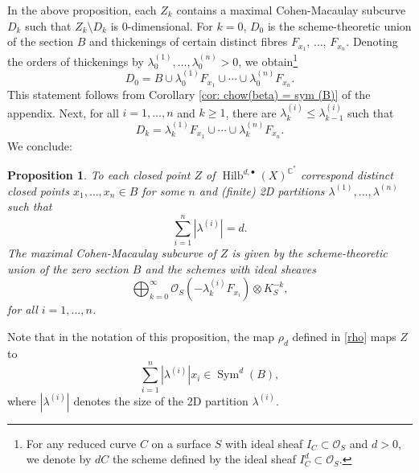 \documentclass{amsart}
\newtheorem{proposition}[theorem]{Proposition}
\theoremstyle{definition}
\newcommand{\CC} {\mathbb{C}}          %
\renewcommand{\O}{\mathcal{O}}
\newcommand{\Sym}{\operatorname{Sym}}
\newcommand{\Hilb}{\operatorname{Hilb}}
\begin{document}
In the above proposition, each $Z_k$ contains a maximal Cohen-Macaulay subcurve $D_k$ such that $Z_k \setminus D_k$ is 0-dimensional. For $k=0$, $D_0$ is the scheme-theoretic union of the section $B$ and thickenings of certain distinct fibres $F_{x_1}$, $\ldots$, $F_{x_n}$. Denoting the orders of thickenings by $\lambda_{0}^{(1)}, \ldots, \lambda_{0}^{(n)} > 0$, we obtain\footnote{For any reduced curve $C$ on a surface $S$ with ideal sheaf $I_C \subset \O_S$ and $d>0$, we denote by $d C$ the scheme defined by the ideal sheaf $I_{C}^{d} \subset \O_S$.}
$$
D_0 = B \cup \lambda_{0}^{(1)} F_{x_1} \cup \cdots \cup \lambda_{0}^{(n)} F_{x_n}.
$$
This statement follows from Corollary \ref{cor: chow(beta) = sym (B)} of the appendix. Next, for all $i = 1, \ldots, n$ and $k \geq 1$, there are $\lambda_{k}^{(i)} \leq \lambda_{k-1}^{(i)}$ such that
$$
D_k = \lambda_{k}^{(1)} F_{x_1} \cup \cdots \cup \lambda_{k}^{(n)} F_{x_n}.
$$
We conclude:
\begin{proposition} \label{ZCM}
To each closed point $Z$ of $\Hilb^{d,\bullet}(X)^{\CC^*}$ correspond distinct closed points $x_1, \ldots, x_n \in B$ for some $n$ and (finite) 2D partitions $\lambda^{(1)}, \ldots, \lambda^{(n)}$ such that
$$
\sum_{i=1}^{n} |\lambda^{(i)}| = d.
$$
The maximal Cohen-Macaulay subcurve of $Z$ is given by the scheme-theoretic union of the zero section $B$ and the schemes with ideal sheaves
\begin{equation} \label{CMcurve}
\bigoplus_{k=0}^{\infty} \O_{S}(-\lambda_{k}^{(i)} F_{x_i}) \otimes K_{S}^{-k},
\end{equation}
for all $i = 1, \ldots, n$.
\end{proposition}

Note that in the notation of this proposition, the map $\rho_d$ defined in \eqref{rho} maps $Z$ to
$$
\sum_{i=1}^{n} |\lambda^{(i)}| x_i \in \Sym^d(B),
$$
where $|\lambda^{(i)}|$ denotes the size of the 2D partition $\lambda^{(i)}$.
\end{document}
